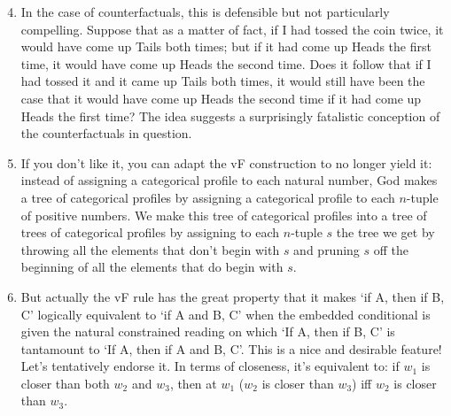 \documentclass[leqno, 11pt, a5paper, openany]{article}
\begin{document}
\begin{enumerate}
\setcounter{enumi}{3}
\item
  In the case of counterfactuals, this is defensible but not
  particularly compelling. Suppose that as a matter of fact, if I had
  tossed the coin twice, it would have come up Tails both times; but if
  it had come up Heads the first time, it would have come up Heads the
  second time. Does it follow that if I had tossed it and it came up
  Tails both times, it would still have been the case that it would have
  come up Heads the second time if it had come up Heads the first time?
  The idea suggests a surprisingly fatalistic conception of the
  counterfactuals in question.\\
\item
  If you don't like it, you can adapt the vF construction to no longer
  yield it: instead of assigning a categorical profile to each natural
  number, God makes a tree of categorical profiles by assigning a
  categorical profile to each $n$-tuple of positive numbers. We make
  this tree of categorical profiles into a tree of trees of categorical
  profiles by assigning to each $n$-tuple $s$ the tree we get by
  throwing all the elements that don't begin with $s$ and pruning
  $s$ off the beginning of all the elements that do begin with
  $s$.\\
\item
  But actually the vF rule has the great property that it makes ‘if A,
  then if B, C’ logically equivalent to ‘if A and B, C’ when the
  embedded conditional is given the natural constrained reading on which
  ‘If A, then if B, C’ is tantamount to ‘If A, then if A and B, C’. This
  is a nice and desirable feature! Let's tentatively endorse it. In
  terms of closeness, it's equivalent to: if $w_1$ is closer than both $w_2$
  and $w_3$, then at $w_1$ ($w_2$ is closer than $w_3$) iff $w_2$ is closer than $w_3$.
\end{enumerate}
\end{document}

